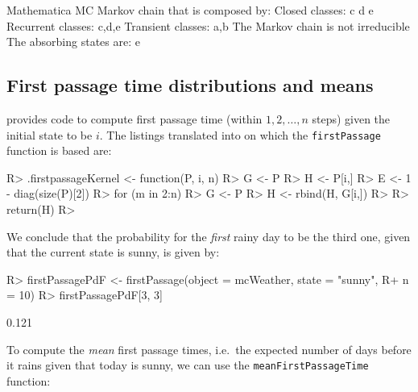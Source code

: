 \documentclass[article,nojss]{jss}
\begin{document}
\begin{CodeChunk}

\begin{CodeOutput}
Mathematica MC  Markov chain that is composed by: 
Closed classes: 
c d 
e 
Recurrent classes: 
{c,d},{e}
Transient classes: 
{a,b}
The Markov chain is not irreducible 
The absorbing states are: e
\end{CodeOutput}
\end{CodeChunk}

\hypertarget{first-passage-time-distributions-and-means}{%
\subsection{First passage time distributions and means}\label{first-passage-time-distributions-and-means}}

\cite{renaldoMatlab} provides code to compute first passage time (within \(1,2,\ldots, n\) steps) given the initial state to be \(i\). The  listings translated into  on which the \texttt{firstPassage} function is based are:

\begin{CodeChunk}

\begin{CodeInput}
R> .firstpassageKernel <- function(P, i, n){
R>   G <- P
R>   H <- P[i,]
R>   E <- 1 - diag(size(P)[2])
R>   for (m in 2:n) {
R>     G <- P %
R>     H <- rbind(H, G[i,])
R>   }
R>   return(H)
R> }
\end{CodeInput}
\end{CodeChunk}

We conclude that the probability for the \emph{first} rainy day to be the third one, given that the current state is sunny, is given by:

\begin{CodeChunk}

\begin{CodeInput}
R> firstPassagePdF <- firstPassage(object = mcWeather, state = "sunny", 
R+                                 n = 10)
R> firstPassagePdF[3, 3]
\end{CodeInput}

\begin{CodeOutput}
[1] 0.121
\end{CodeOutput}
\end{CodeChunk}

To compute the \emph{mean} first passage times, i.e.~the expected number of days before it rains
given that today is sunny, we can use the \texttt{meanFirstPassageTime} function:
\end{document}
